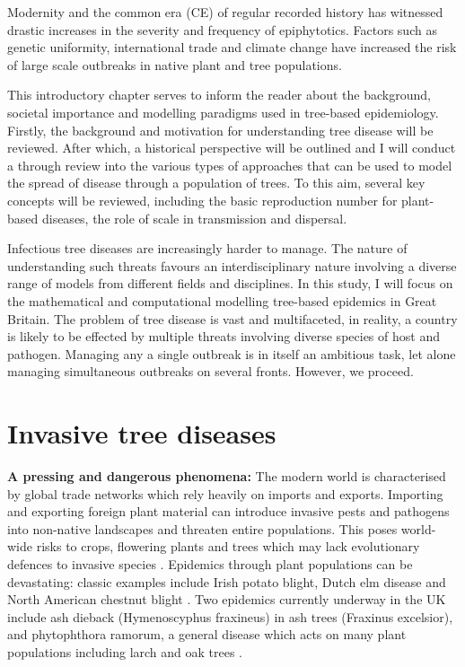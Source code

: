 Modernity and the common era (CE) of regular recorded history has witnessed drastic increases in the severity and frequency of epiphytotics. Factors such as genetic uniformity, international trade and climate change have increased the risk of large scale outbreaks in native plant and tree populations.

This introductory chapter serves to inform the reader about the background, societal importance and modelling paradigms used in tree-based epidemiology. Firstly, the background and motivation for understanding tree disease will be reviewed. After which, a historical perspective will be outlined and I will conduct a through review into the various types of approaches that can be used to model the spread of disease through a population of trees. To this aim, several key concepts will be reviewed, including the basic reproduction number for plant-based diseases, the role of scale in transmission and dispersal. 

Infectious tree diseases are increasingly harder to manage. The nature of understanding such threats favours an interdisciplinary nature involving a diverse range of models from different fields and disciplines.
In this study, I will focus on the mathematical and computational modelling tree-based epidemics in Great Britain. The problem of tree disease is vast and multifaceted, in reality, a country is likely to be effected by multiple threats involving diverse species of host and pathogen. Managing any a single outbreak is in itself an ambitious task, let alone managing simultaneous outbreaks on several fronts. However, we proceed.\\

\section{Invasive tree diseases}
\textbf{A pressing and dangerous phenomena: } The modern world is characterised by global trade networks which rely heavily on imports and exports. Importing and exporting foreign plant material can introduce invasive pests and pathogens into non-native landscapes and threaten entire populations. This poses world-wide risks to crops, flowering plants and trees which may lack evolutionary defences to invasive species \cite{doi:10.1002/9781444329988.ch8}. Epidemics through plant populations can be devastating: classic examples include Irish potato blight, Dutch elm disease \cite{doi:10.1111/j.1365-3059.2010.02391.x} and North American chestnut blight \cite{doi:10.1002/9780470535486.ch7}. Two epidemics currently underway in the UK include ash dieback (Hymenoscyphus fraxineus) in ash trees (Fraxinus excelsior),  \cite{ash-dieback-costs} and phytophthora ramorum, a general disease which acts on many plant populations including larch and oak trees \cite{p.ramourum}.

